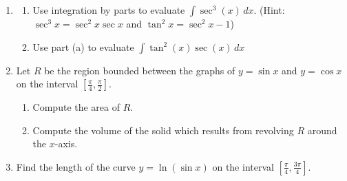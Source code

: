 \documentclass[12pt]{article}
\newif\ifans
\begin{document}
\begin{enumerate}
\begin{enumerate}
\end{enumerate}

\item \begin{enumerate}

\item Use integration by parts to evaluate $\int \sec^{3}{(x)}\,dx$.  (Hint: $\sec^3{x}=\sec^2{x}\sec{x}$ and $\tan^2{x}=\sec^2{x}-1$)

\ifans{\fbox{$\frac{1}{2}\sec{(x)}\tan{(x)}+\frac{1}{2}\ln{|\sec{x}+\tan{x}|}+C$}} \fi

\item Use part (a) to evaluate $\int \tan^{2}{(x)}\sec{(x)}\,dx$

\ifans{\fbox{$\frac{1}{2}\sec{(x)}\tan{(x)}-\frac{1}{2}\ln{|\sec{x}+\tan{x}|}+C$}} \fi

\end{enumerate}

\item Let $R$ be the region bounded between the graphs of $y=\sin{x}$ and $y=\cos{x}$ on the interval $\left[\frac{\pi}{4},\frac{\pi}{2}\right]$.

\begin{enumerate}

\item Compute the area of $R$.

\ifans{\fbox{$\sqrt{2}-1$}} \fi

\item Compute the volume of the solid which results from revolving $R$ around the $x$-axis.

\ifans{\fbox{$\frac{\pi}{2}$}} \fi

\end{enumerate}

\item Find the length of the curve $y=\ln{(\sin{x})}$ on the interval $\left[\frac{\pi}{4},\frac{3\pi}{4}\right]$.

\ifans{\fbox{$2\ln{\left(2+\sqrt{2}\right)}-\ln{2}$; Detailed Solution: \textcolor{blue}{\href{http://www.math.drexel.edu/classes/Calculus/resources/Math122HW/Solutions/122_15_Trig_Int_27.pdf}{Here}}}} \fi

\end{enumerate}
\end{document}
